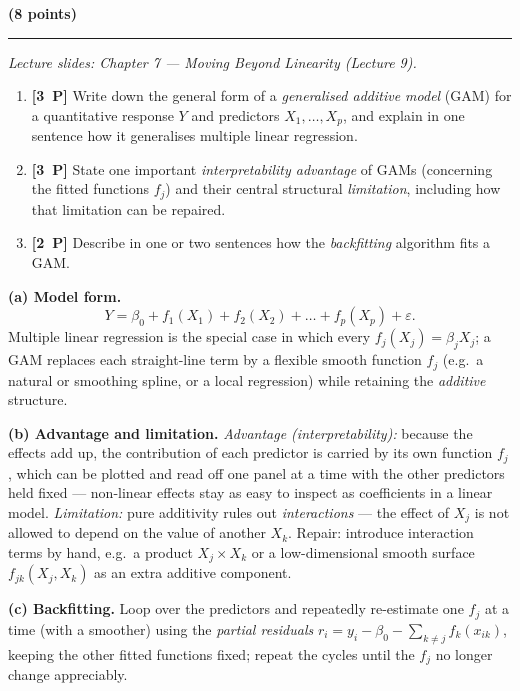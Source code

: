 \documentclass[11pt,a4paper]{article}
\newcommand{\problem}[2]{\par\vspace{7mm}\noindent{\large\textbf{Problem #1}}%
  \hfill{\large\textbf{(#2 points)}}\par\nopagebreak\vspace{0.6mm}%
  \noindent\rule{\textwidth}{0.6pt}\par\nopagebreak\vspace{2.5mm}}
\newcommand{\pp}[1]{\textbf{[#1~P]}\enspace}
\begin{document}
\problem{2: Generalised additive models}{8}
{\small\itshape Lecture slides: Chapter 7 --- Moving Beyond Linearity (Lecture 9).}\par\vspace{1mm}

\begin{enumerate}[label=(\alph*),leftmargin=7mm,itemsep=2.5mm]
  \item \pp{3} Write down the general form of a \emph{generalised additive model} (GAM) for a
    quantitative response $Y$ and predictors $X_1,\dots,X_p$, and explain in one sentence how it
    generalises multiple linear regression.
  \item \pp{3} State one important \emph{interpretability advantage} of GAMs (concerning the
    fitted functions $f_j$) and their central structural \emph{limitation}, including how that
    limitation can be repaired.
  \item \pp{2} Describe in one or two sentences how the \emph{backfitting} algorithm fits a GAM.
\end{enumerate}

\ifdefined\withsolutions
\begin{solutionbox}
\textbf{(a) Model form.}
\[
  Y=\beta_0+f_1(X_1)+f_2(X_2)+\dots+f_p(X_p)+\varepsilon .
\]
Multiple linear regression is the special case in which every $f_j(X_j)=\beta_jX_j$; a GAM
replaces each straight-line term by a flexible smooth function $f_j$ (e.g.\ a natural or
smoothing spline, or a local regression) while retaining the \emph{additive} structure.

\medskip
\textbf{(b) Advantage and limitation.}
\emph{Advantage (interpretability):} because the effects add up, the contribution of each
predictor is carried by its own function $f_j$, which can be plotted and read off one panel at
a time with the other predictors held fixed --- non-linear effects stay as easy to inspect as
coefficients in a linear model.
\emph{Limitation:} pure additivity rules out \emph{interactions} --- the effect of $X_j$ is not
allowed to depend on the value of another $X_k$. Repair: introduce interaction terms by hand,
e.g.\ a product $X_j\times X_k$ or a low-dimensional smooth surface $f_{jk}(X_j,X_k)$ as an
extra additive component.

\medskip
\textbf{(c) Backfitting.}
Loop over the predictors and repeatedly re-estimate one $f_j$ at a time (with a smoother) using
the \emph{partial residuals} $r_i=y_i-\beta_0-\sum_{k\ne j}f_k(x_{ik})$, keeping the other
fitted functions fixed; repeat the cycles until the $f_j$ no longer change appreciably.
\end{solutionbox}
\fi
\end{document}
